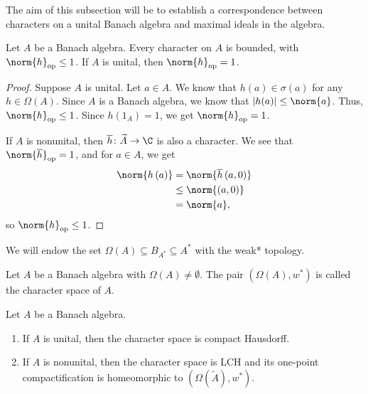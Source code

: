 \documentclass[10pt]{mypackage}
\DeclareMathOperator{\op}{op}
\begin{document}
The aim of this subsection will be to establish a correspondence between characters on a unital Banach algebra and maximal ideals in the algebra.
\begin{proposition}
  Let $A$ be a Banach algebra. Every character on $A$ is bounded, with $\norm{h}_{\op} \leq 1$. If $A$ is unital, then $\norm{h}_{\op} = 1$.
\end{proposition}
\begin{proof}
  Suppose $A$ is unital. Let $a\in A$. We know that $h(a)\in \sigma\left(a\right)$ for any $h\in \Omega\left(A\right)$. Since $A$ is a Banach algebra, we know that $\left\vert h(a) \right\vert\leq \norm{a}$. Thus, $\norm{h}_{\op} \leq 1$. Since $h\left(1_A\right) = 1$, we get $\norm{h}_{\op} = 1$.\newline

  If $A$ is nonunital, then $\overline{h}\colon \widetilde{A}\rightarrow \C$ is also a character. We see that $\norm{\overline{h}}_{\op} = 1$, and for $a\in A$, we get
  \begin{align*}
    \norm{h\left(a\right)} &= \norm{\overline{h}\left(a,0\right)}\\
                           &\leq \norm{\left(a,0\right)}\\
                           &= \norm{a},
  \end{align*}
  so $\norm{h}_{\op}\leq 1$.
\end{proof}
We will endow the set $\Omega\left(A\right)\subseteq B_{A^{\ast}}\subseteq A^{\ast}$ with the weak* topology. 
\begin{definition}
  Let $A$ be a Banach algebra with $\Omega\left(A\right)\neq \emptyset$. The pair $\left(\Omega\left(A\right),w^{\ast}\right)$ is called the character space of $A$.
\end{definition}
\begin{proposition}
  Let $A$ be a Banach algebra.
  \begin{enumerate}[(1)]
    \item If $A$ is unital, then the character space is compact Hausdorff.
    \item If $A$ is nonunital, then the character space is LCH and its one-point compactification is homeomorphic to $\left(\Omega\left(\widetilde{A}\right),w^{\ast}\right)$.
  \end{enumerate}
\end{proposition}
\end{document}
